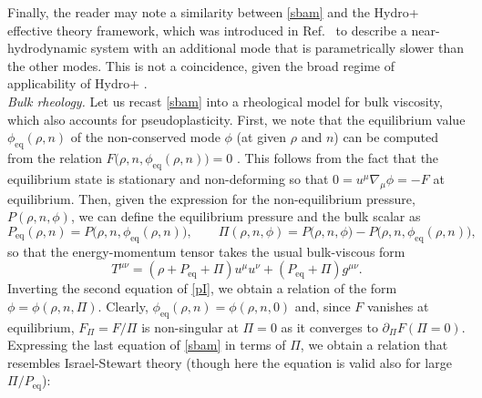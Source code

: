 \documentclass[aps,prl,noshowpacs,noshowkeys,floatfix,superscriptaddress,singlecolum,nofootinbib]{revtex4-2}
\theoremstyle{definition}
\theoremstyle{theorem}
\begin{document}
Finally, the reader may note a similarity between \eqref{sbam} and the Hydro+ effective theory framework, which was introduced in Ref.\ \cite{Stephanov:2017ghc} to describe
a near-hydrodynamic system with an additional mode that is
parametrically slower than the other modes. This is not a coincidence, given the broad regime of applicability of Hydro+ \cite{Stephanov:2017ghc}. \\ 

\noindent \textit{Bulk rheology.} Let us recast \eqref{sbam} into a rheological model for bulk viscosity, which also accounts for pseudoplasticity. First, we note that the equilibrium value $\phi_{\text{eq}}(\rho,n)$ of the non-conserved mode $\phi$ (at given $\rho$ and $n$) can be computed from the relation $F\big(\rho,n,\phi_{\text{eq}}(\rho,n)\big)=0$ \cite{Stephanov:2017ghc}. This follows from the fact that the equilibrium state is stationary and non-deforming so that $0=u^\mu \nabla_\mu \phi=-F$ at equilibrium. Then, given the expression for the non-equilibrium pressure, $P(\rho,n,\phi)$, we can define the equilibrium pressure and the bulk scalar as
\begin{equation}\label{pI}
P_{\text{eq}}(\rho,n)= P\big(\rho,n,\phi_{\text{eq}}(\rho,n)\big),\qquad
\Pi(\rho,n,\phi)= P\big(\rho,n,\phi)-P\big(\rho,n,\phi_{\text{eq}}(\rho,n)\big),
\end{equation}
so that the energy-momentum tensor takes the usual bulk-viscous form
\begin{equation}
T^{\mu \nu}=(\rho+P_{\text{eq}}+\Pi)u^\mu u^\nu+(P_{\text{eq}}+\Pi)g^{\mu \nu}.
\end{equation}
Inverting the second equation of \eqref{pI}, we obtain a relation of the form $\phi=\phi(\rho,n,\Pi)$. Clearly, $\phi_\text{eq}(\rho,n)=\phi(\rho,n,0)$ and, since $F$ vanishes at equilibrium,  $F_\Pi=F/\Pi$ is non-singular at $\Pi=0$ as it converges to $\partial_\Pi F(\Pi=0)$. Expressing the last equation of \eqref{sbam} in terms of $\Pi$, we obtain a relation that resembles Israel-Stewart theory (though here the equation is valid also for large $\Pi/P_{\textrm{eq}}$): 
\end{document}
